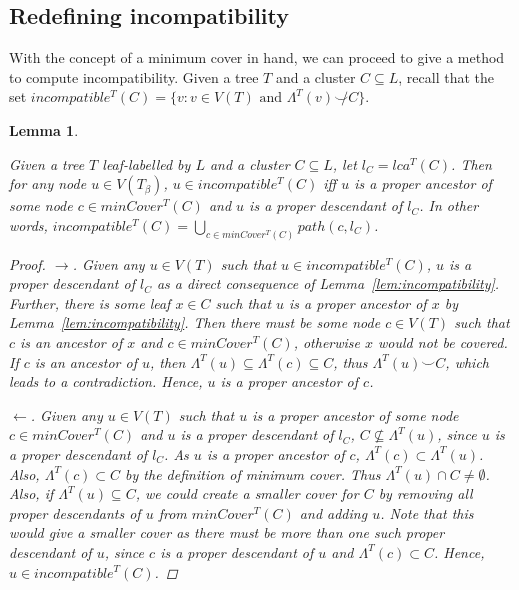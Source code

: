 \documentclass{article}
\newcommand{\compatible}{\smile}
\newcommand{\leafset}{\Lambda}
\newcommand{\TB}{T_\beta}
\newtheorem{incompatibilitymincover}[incompatibility]{Lemma}
\begin{document}
    \subsection{Redefining incompatibility}
    \label{subsec:redefiningincompatibility}

    With the concept of a minimum cover in hand, we can proceed to give a method to compute incompatibility. Given a tree $T$ and a cluster $C \subseteq L$, recall that the set $incompatible^{T}(C) = \{v : v \in V(T) \text{ and } \leafset^{T}(v) \not\compatible C\}$.
    \newline

    \begin{incompatibilitymincover}
        \label{lem:incompatibilitymincover}

        Given a tree $T$ leaf-labelled by $L$ and a cluster $C \subseteq L$, let $l_C = lca^{T}(C)$. Then for any node $u \in V(\TB)$, $u \in incompatible^{T}(C)$ iff $u$ is a proper ancestor of some node $c \in minCover^{T}(C)$ and $u$ is a proper descendant of $l_C$. In other words, $incompatible^{T}(C) = \bigcup_{c \in minCover^{T}(C)} path(c, l_C)$.

        \begin{proof}
            $\longrightarrow$. Given any $u \in V(T)$ such that $u \in incompatible^{T}(C)$, $u$ is a proper descendant of $l_C$ as a direct consequence of Lemma~\ref{lem:incompatibility}. Further, there is some leaf $x \in C$ such that $u$ is a proper ancestor of $x$ by Lemma~\ref{lem:incompatibility}. Then there must be some node $c \in V(T)$ such that $c$ is an ancestor of $x$ and $c \in minCover^{T}(C)$, otherwise $x$ would not be covered. If $c$ is an ancestor of $u$, then $\leafset^{T}(u) \subseteq \leafset^{T}(c) \subseteq C$, thus $\leafset^{T}(u) \compatible C$, which leads to a contradiction. Hence, $u$ is a proper ancestor of $c$.

            $\longleftarrow$. Given any $u \in V(T)$ such that $u$ is a proper ancestor of some node $c \in minCover^{T}(C)$ and $u$ is a proper descendant of $l_C$, $C \not\subseteq \leafset^{T}(u)$, since $u$ is a proper descendant of $l_C$. As $u$ is a proper ancestor of $c$, $\leafset^{T}(c) \subset \leafset^{T}(u)$. Also, $\leafset^{T}(c) \subset C$ by the definition of minimum cover. Thus $\leafset^{T}(u) \cap C \neq \emptyset$. Also, if $\leafset^{T}(u) \subseteq C$, we could create a smaller cover for $C$ by removing all proper descendants of $u$ from $minCover^{T}(C)$ and adding $u$. Note that this would give a smaller cover as there must be more than one such proper descendant of $u$, since $c$ is a proper descendant of $u$ and $\leafset^{T}(c) \subset C$. Hence, $u \in incompatible^{T}(C)$.
        \end{proof}
    \end{incompatibilitymincover}
\end{document}
